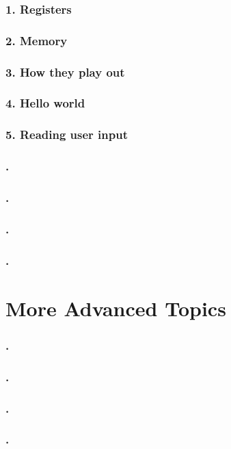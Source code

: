 \documentclass[a4paper,11pt]{book}
\begin{document}
\subsection{1. Registers}
\subsection{2. Memory}
\subsection{3. How they play out}
\subsection{4. Hello world}
\subsection{5. Reading user input}
\subsection{.}
\subsection{.}
\subsection{.}
\subsection{.}

\chapter{More Advanced Topics}

\subsection{.}
\subsection{.}
\subsection{.}
\subsection{.}
\end{document}
